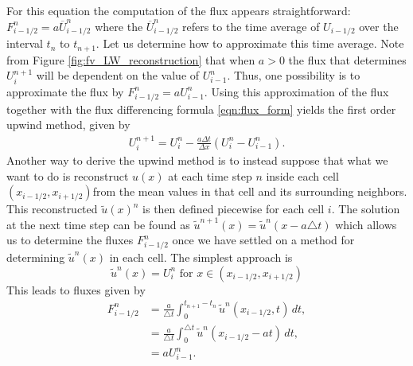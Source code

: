 For this equation the computation of the flux appears straightforward: $F_{i-1/2}^n = a\overline{U}^n_{i-1/2}$ where the $\overline{U}^n_{i-1/2}$ refers to the time average of $U_{i-1/2}$ over the interval $t_n$ to $t_{n+1}$.
Let us determine how to approximate this time average.
Note from Figure \ref{fig:fv_LW_reconstruction} that when $a>0$ the flux that determines $U_i^{n+1}$ will be dependent on the value of $U_{i-1}^n$. Thus, one possibility is to approximate the flux by $F_{i-1/2}^n = aU_{i-1}^n$.
Using this approximation of the flux together with the flux differencing formula \eqref{eqn:flux_form} yields the first order upwind method, given by
\begin{align*}
U_i^{n+1} = U_i^n - \frac{a\Delta t}{\Delta x}\left(U_i^n-U_{i-1}^n\right).
\end{align*}
Another way to derive the upwind method is to instead suppose that what we want to do is reconstruct $u(x)$ at each time step $n$ inside each cell $(x_{i-1/2},x_{i+1/2})$from the mean values in that cell and its surrounding neighbors. This reconstructed $\tilde{u}(x)^n$ is then defined piecewise for each cell $i$.
The solution at the next time step can be found as $\tilde{u}^{n+1}(x) = \tilde{u}^n(x-a\triangle t)$ which allows us to determine the fluxes $F^n_{i-1/2}$ once we have settled on a method for determining $\tilde{u}^n(x)$ in each cell.
The simplest approach is
\[\tilde{u}^n(x) = U_i^n \text{ for }x \in (x_{i-1/2},x_{i+1/2})\]
This leads to fluxes given by
\begin{align}
F_{i-1/2}^n &= \frac{a}{\triangle t}\int_{0}^{t_{n+1}-t_n} \tilde{u}^n(x_{i-1/2},t)\, dt , \\
&= \frac{a}{\triangle t}\int_{0}^{\triangle t} \tilde{u}^n(x_{i-1/2}-at)\, dt  ,\\
&= aU_{i-1}^n.\nonumber
\end{align}

